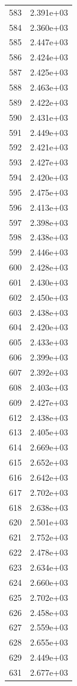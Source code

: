 \documentclass[12pt]{article}
\begin{document}
\begin{longtable}{@{}cc@{}}
583 & 2.391e+03 \\
584 & 2.360e+03 \\
585 & 2.447e+03 \\
586 & 2.424e+03 \\
587 & 2.425e+03 \\
588 & 2.463e+03 \\
589 & 2.422e+03 \\
590 & 2.431e+03 \\
591 & 2.449e+03 \\
592 & 2.421e+03 \\
593 & 2.427e+03 \\
594 & 2.420e+03 \\
595 & 2.475e+03 \\
596 & 2.413e+03 \\
597 & 2.398e+03 \\
598 & 2.438e+03 \\
599 & 2.446e+03 \\
600 & 2.428e+03 \\
601 & 2.430e+03 \\
602 & 2.450e+03 \\
603 & 2.438e+03 \\
604 & 2.420e+03 \\
605 & 2.433e+03 \\
606 & 2.399e+03 \\
607 & 2.392e+03 \\
608 & 2.403e+03 \\
609 & 2.427e+03 \\
612 & 2.438e+03 \\
613 & 2.405e+03 \\
614 & 2.669e+03 \\
615 & 2.652e+03 \\
616 & 2.642e+03 \\
617 & 2.702e+03 \\
618 & 2.638e+03 \\
620 & 2.501e+03 \\
621 & 2.752e+03 \\
622 & 2.478e+03 \\
623 & 2.634e+03 \\
624 & 2.660e+03 \\
625 & 2.702e+03 \\
626 & 2.458e+03 \\
627 & 2.559e+03 \\
628 & 2.655e+03 \\
629 & 2.449e+03 \\
631 & 2.677e+03 \\

\end{longtable}
\end{document}
